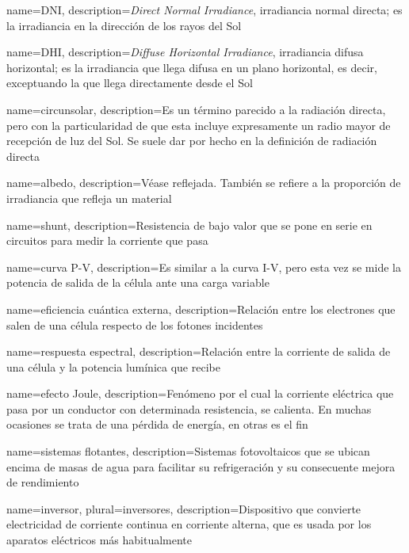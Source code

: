 {
    name={DNI},
    description={\textit{Direct Normal Irradiance}, irradiancia normal directa; es la irradiancia en la dirección de los rayos del Sol}
}

{
    name={DHI},
    description={\textit{Diffuse Horizontal Irradiance}, irradiancia difusa horizontal; es la irradiancia que llega difusa en un plano horizontal, es decir, exceptuando la que llega directamente desde el Sol}
}

{
    name={circunsolar},
    description={Es un término parecido a la radiación \gls{directa}, pero con la particularidad de que esta incluye expresamente un radio mayor de recepción de luz del Sol. Se suele dar por hecho en la definición de radiación \gls{directa}}
}

{
    name={albedo},
    description={Véase \Gls{reflejada}. También se refiere a la proporción de irradiancia que refleja un material}
}

{
    name={shunt},
    description={Resistencia de bajo valor que se pone en serie en circuitos para medir la corriente que pasa}
}

{
    name={curva P-V},
    description={Es similar a la \gls{curva I-V}, pero esta vez se mide la potencia de salida de la célula ante una \gls{carga} variable}
}

{
    name={eficiencia cuántica externa},
    description={Relación entre los electrones que salen de una célula respecto de los fotones incidentes}
}

{
    name={respuesta espectral},
    description={Relación entre la corriente de salida de una célula y la potencia lumínica que recibe}
}

{
    name={efecto Joule},
    description={Fenómeno por el cual la corriente eléctrica que pasa por un conductor con determinada resistencia, se calienta. En muchas ocasiones se trata de una pérdida de energía, en otras es el fin}
}

{
    name={sistemas flotantes},
    description={Sistemas fotovoltaicos que se ubican encima de masas de agua para facilitar su refrigeración y su consecuente mejora de rendimiento}
}

{
    name={inversor},
    plural={inversores},
    description={Dispositivo que convierte electricidad de corriente continua en corriente alterna, que es usada por los aparatos eléctricos más habitualmente}
}

